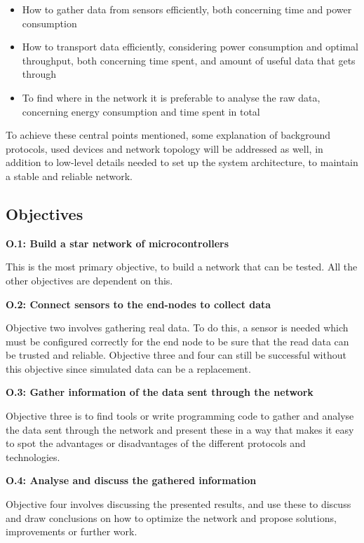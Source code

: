 \begin{itemize}
	\item How to gather data from sensors efficiently, both concerning time and power consumption
	\item How to transport data efficiently, considering power consumption and optimal throughput, both concerning time spent, and amount of useful data that gets through
	\item To find where in the network it is preferable to analyse the raw data, concerning energy consumption and time spent in total
\end{itemize}

\noindent To achieve these central points mentioned, some explanation of background protocols, used devices and network topology will be addressed as well, in addition to low-level details needed to set up the system architecture, to maintain a stable and reliable network. 


\subsection{Objectives}

\noindent \textbf{O.1: Build a star network of \glspl{microcontroller}}

\noindent This is the most primary objective, to build a network that can be tested. All the other objectives are dependent on this.  

\noindent\textbf{O.2: Connect sensors to the end-nodes to collect data}

\noindent Objective two involves gathering real data. To do this, a sensor is needed which must be configured correctly for the end node to be sure that the read data can be trusted and reliable. Objective three and four can still be successful without this objective since simulated data can be a replacement. 

\noindent\textbf{O.3: Gather information of the data sent through the network}

\noindent Objective three is to find tools or write programming code to gather and analyse the data sent through the network and present these in a way that makes it easy to spot the advantages or disadvantages of the different protocols and technologies. 

\newpage
\noindent\textbf{O.4: Analyse and discuss the gathered information}

\noindent Objective four involves discussing the presented results, and use these to discuss and draw conclusions on how to optimize the network and propose solutions, improvements or further work. 

